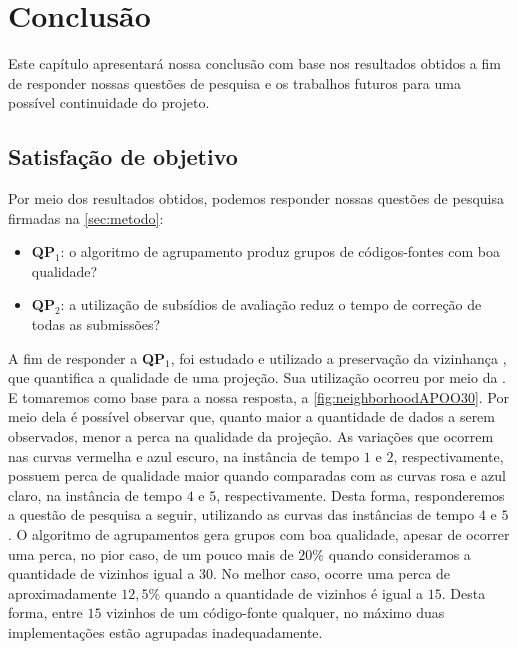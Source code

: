 \chapter{Conclusão}
\label{chap:Conclusao}

	Este capítulo apresentará nossa conclusão com base nos resultados obtidos a fim de
	responder nossas questões de pesquisa e os trabalhos futuros para uma possível
	continuidade do projeto.
	
	\section{Satisfação de objetivo}
	Por meio dos resultados obtidos, podemos responder nossas questões de pesquisa
	firmadas na \cref{sec:metodo}:
	
	\begin{itemize}
		\item \textbf{QP$_1$}: o algoritmo de agrupamento produz grupos de códigos-fontes
		com boa qualidade?
		\item \textbf{QP$_2$}: a utilização de subsídios de avaliação reduz o tempo
		de correção de todas as submissões?
	\end{itemize}
	
	A fim de responder a \textbf{QP$_1$}, foi estudado e utilizado a preservação
	da vizinhança \cite{paulovich2008hipp}, que quantifica a qualidade de uma projeção.
	Sua utilização ocorreu por meio da . E tomaremos como base
	para a nossa resposta, a \cref{fig:neighborhoodAPOO30}. Por meio dela é possível
	observar que, quanto maior a quantidade de dados a serem observados, menor a perca
	na qualidade da projeção. As variações que ocorrem nas curvas vermelha e azul
	escuro, na instância de tempo $1$ e $2$, respectivamente, possuem perca de
	qualidade maior quando comparadas com as curvas rosa e azul claro, na instância de
	tempo $4$ e $5$, respectivamente. Desta forma, responderemos a questão de pesquisa
	a seguir, utilizando as curvas das instâncias de tempo $4$ e $5$. O algoritmo
	de agrupamentos gera grupos com boa qualidade, apesar de ocorrer uma perca, no
	pior caso, de um pouco mais de $20\%$ quando consideramos a quantidade de vizinhos
	igual a $30$. No melhor caso, ocorre uma perca de aproximadamente $12,5\%$ quando
	a quantidade de vizinhos é igual a $15$. Desta forma, entre $15$ vizinhos de um
	código-fonte qualquer, no máximo duas implementações estão agrupadas inadequadamente. 
	
